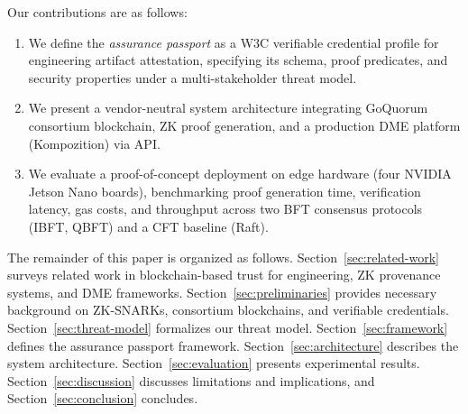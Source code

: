 Our contributions are as follows:
\begin{enumerate}
    \item We define the \emph{assurance passport} as a W3C verifiable credential profile for engineering artifact attestation, specifying its schema, proof predicates, and security properties under a multi-stakeholder threat model.
    \item We present a vendor-neutral system architecture integrating GoQuorum consortium blockchain, ZK proof generation, and a production DME platform (Kompozition) via API.
    \item We evaluate a proof-of-concept deployment on edge hardware (four NVIDIA Jetson Nano boards), benchmarking proof generation time, verification latency, gas costs, and throughput across two BFT consensus protocols (IBFT, QBFT) and a CFT baseline (Raft).
\end{enumerate}

The remainder of this paper is organized as follows.
Section~\ref{sec:related-work} surveys related work in blockchain-based trust for engineering, ZK provenance systems, and DME frameworks.
Section~\ref{sec:preliminaries} provides necessary background on ZK-SNARKs, consortium blockchains, and verifiable credentials.
Section~\ref{sec:threat-model} formalizes our threat model.
Section~\ref{sec:framework} defines the assurance passport framework.
Section~\ref{sec:architecture} describes the system architecture.
Section~\ref{sec:evaluation} presents experimental results.
Section~\ref{sec:discussion} discusses limitations and implications, and Section~\ref{sec:conclusion} concludes.
